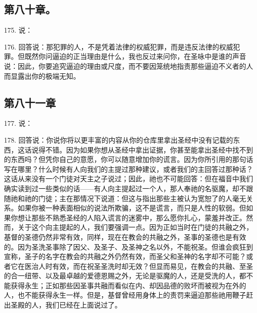 
\subsection{第八十章。}

175. 说：\par

176. 回答说：那犯罪的人，不是凭着法律的权威犯罪，而是违反法律的权威犯罪。但既然你问逼迫的正当理由是什么，我也反过来问你，在圣咏中是谁的声音说：因此，你要追究逼迫的理由或尺度，而不要因笼统地指责那些逼迫不义者的人而显露出你的极端无知。\par


\subsection{第八十一章}

177. 说：\par

178. 回答说：你说你将以更丰富的内容从你的仓库里拿出圣经中没有记载的东西，这话说得不错。因为如果你想从圣经中拿出证据，你甚至能拿出圣经中找不到的东西吗？但凭你自己的意愿，你可以随意增加你的谎言。因为你所引用的那句话写在哪里？什么时候有人向我们的主提过那种建议，或者我们的主回答过那种话？这话从来没有一个门徒对天主之子说过；因此，祂也不可能回答：但在福音中我们确实读到过一些类似的话——有人向主提起过一个人，那人奉祂的名驱魔，却不跟随祂和祂的门徒；主在那情况下说道：但这与指出那些主被认为宽恕了的人毫无关系。如果你被一种表面相似的说法所欺骗，这不是谎言，而只是人性的软弱。但如果你想让那些不熟悉圣经的人陷入谎言的迷雾中，那么愿你扎心，蒙羞并改正。然而，关于这个向主提起的人，我们要强调一点。因为正如当时在门徒的共融之外，基督的圣德仍然非常有效，同样，现在在教会的共融之外，圣事的圣德也是有效的。因为圣洗圣事除了因父、及圣子、及圣神之名以外，不能祝圣。但谁会疯狂到宣称，圣子的名字在教会的共融之外仍然有效，而圣父和圣神的名字却不可能？或者它在医治人时有效，而在祝圣圣洗时却无效？但显而易见，在教会的共融、至圣的合一纽带、以及最卓越的爱德恩赐之外，无论是驱魔的人，还是受洗的人，都不能获得永生；正如那些因圣事共融而看似在内、却因品德的败坏而被视为在外的人，也不能获得永生一样。但是，基督曾经用身体上的责罚来逼迫那些祂用鞭子赶出圣殿的人，我们已经在上面说过了。\par

